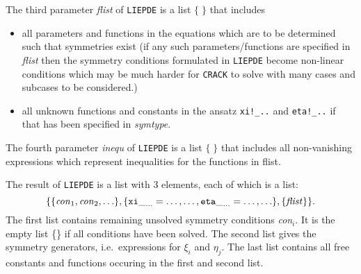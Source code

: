 \noindent The third parameter {\it flist} of {\tt LIEPDE} is a list $\{\;\}$ 
that includes
\begin{itemize}
\item all parameters and functions in the equations which are to
      be determined such that symmetries exist (if any such 
      parameters/functions are 
      specified in {\it flist} then the symmetry conditions 
      formulated in {\tt LIEPDE}
      become non-linear conditions which may be much harder for
      {\tt CRACK} to solve with many cases and subcases to be considered.)
\item all unknown functions and constants in the ansatz 
      \verb+xi!_..+ and \verb+eta!_..+
      if that has been specified in {\it symtype}.
\end{itemize}
\noindent The fourth parameter {\it inequ} of {\tt LIEPDE} is a list $\{\;\}$ 
that includes all non-vanishing expressions which represent
inequalities for the functions in flist.

The result of {\tt LIEPDE} is a list with 3 elements, each of which
is a list:
\[ \{\{{\it con}_1,{\it con}_2,\ldots\},
     \{{\tt xi}\__{\ldots}=\ldots, \ldots,
       {\tt eta}\__{\ldots}=\ldots, \ldots\},
     \{{\it flist}\}\}. \]
The first list contains remaining unsolved symmetry conditions {\it con}$_i$. It
is the empty list \{\} if all conditions have been solved. The second list
gives the symmetry generators, i.e.\ expressions for $\xi_i$ and $\eta_j$. The 
last list contains all free constants and functions occuring in the first
and second list.

%
%
